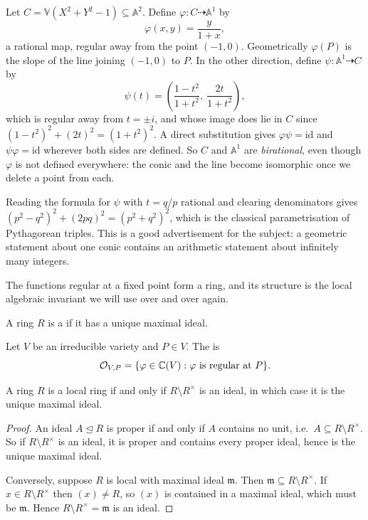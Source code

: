 \documentclass[a4paper]{scrartcl}
\newcommand{\A}{\mathbb{A}}
\newcommand{\V}{\mathbb{V}}
\newcommand{\mm}{\mathfrak{m}}
\newcommand{\Oh}{\mathcal{O}}
\newcommand{\dto}{\dashrightarrow}
\begin{document}
\begin{example}\label{ex:circleparam}
	Let $C = \V(X^2+Y^2-1) \subseteq \A^2$. Define $\varphi \colon C \dto \A^1$ by
	$$\varphi(x,y) = \frac{y}{1+x},$$
	a rational map, regular away from the point $(-1,0)$. Geometrically $\varphi(P)$ is the slope of the line joining $(-1,0)$ to $P$. In the other direction, define $\psi \colon \A^1 \dto C$ by
	$$\psi(t) = \left(\frac{1-t^2}{1+t^2},\ \frac{2t}{1+t^2}\right),$$
	which is regular away from $t = \pm i$, and whose image does lie in $C$ since $(1-t^2)^2 + (2t)^2 = (1+t^2)^2$. A direct substitution gives $\varphi\psi = \mathrm{id}$ and $\psi\varphi = \mathrm{id}$ wherever both sides are defined. So $C$ and $\A^1$ are \emph{birational}, even though $\varphi$ is not defined everywhere: the conic and the line become isomorphic once we delete a point from each.

	Reading the formula for $\psi$ with $t = q/p$ rational and clearing denominators gives $(p^2-q^2)^2 + (2pq)^2 = (p^2+q^2)^2$, which is the classical parametrisation of Pythagorean triples. This is a good advertisement for the subject: a geometric statement about one conic contains an arithmetic statement about infinitely many integers.
\end{example}

The functions regular at a fixed point form a ring, and its structure is the local algebraic invariant we will use over and over again.

\begin{definition}
	A ring $R$ is a  if it has a unique maximal ideal.
\end{definition}

\begin{definition}
	Let $V$ be an irreducible variety and $P \in V$. The  is
	$$\Oh_{V,P} = \{\varphi \in \C(V) : \varphi \text{ is regular at } P\}.$$
\end{definition}

\begin{lemma}\label{lem:localcrit}
	A ring $R$ is a local ring if and only if $R \setminus R^\times$ is an ideal, in which case it is the unique maximal ideal.
\end{lemma}

\begin{proof}
	An ideal $A \trianglelefteq R$ is proper if and only if $A$ contains no unit, i.e.\ $A \subseteq R\setminus R^\times$. So if $R \setminus R^\times$ is an ideal, it is proper and contains every proper ideal, hence is the unique maximal ideal.

	Conversely, suppose $R$ is local with maximal ideal $\mm$. Then $\mm \subseteq R\setminus R^\times$. If $x \in R \setminus R^\times$ then $(x) \neq R$, so $(x)$ is contained in a maximal ideal, which must be $\mm$. Hence $R\setminus R^\times = \mm$ is an ideal.
\end{proof}
\end{document}
